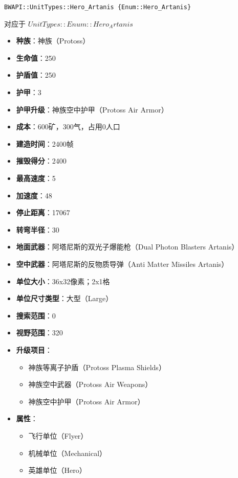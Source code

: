 \begin{tcolorbox}[colback=white, colframe=black!60!white, title=Hero\_Artanis(), arc=0mm]
    \begin{verbatim}
BWAPI::UnitTypes::Hero_Artanis {Enum::Hero_Artanis}
    \end{verbatim}
    对应于  $ UnitTypes::Enum::Hero_Artanis $ 
    \begin{itemize}
        \item \textbf{种族}：神族（Protoss）
        \item \textbf{生命值}：250
        \item \textbf{护盾值}：250
        \item \textbf{护甲}：3
        \item \textbf{护甲升级}：神族空中护甲（Protoss Air Armor）
        \item \textbf{成本}：600矿，300气，占用0人口
        \item \textbf{建造时间}：2400帧
        \item \textbf{摧毁得分}：2400
        \item \textbf{最高速度}：5
        \item \textbf{加速度}：48
        \item \textbf{停止距离}：17067
        \item \textbf{转弯半径}：30
        \item \textbf{地面武器}：阿塔尼斯的双光子爆能枪（Dual Photon Blasters Artanis）
        \item \textbf{空中武器}：阿塔尼斯的反物质导弹（Anti Matter Missiles Artanis）
        \item \textbf{单位大小}：36x32像素；2x1格
        \item \textbf{单位尺寸类型}：大型（Large）
        \item \textbf{搜索范围}：0
        \item \textbf{视野范围}：320
        \item \textbf{升级项目}：
            \begin{itemize}
                \item 神族等离子护盾（Protoss Plasma Shields）
                \item 神族空中武器（Protoss Air Weapons）
                \item 神族空中护甲（Protoss Air Armor）
            \end{itemize}
        \item \textbf{属性}：
            \begin{itemize}
                \item 飞行单位（Flyer）
                \item 机械单位（Mechanical）
                \item 英雄单位（Hero）
            \end{itemize}
    \end{itemize}
\end{tcolorbox}

